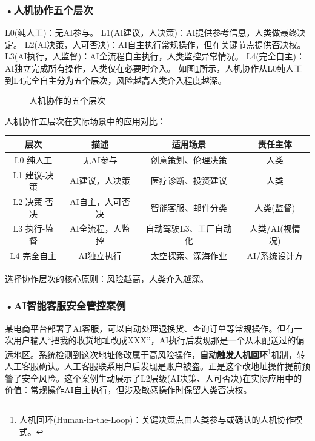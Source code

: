 \subsubsection*{\textbf{•人机协作五个层次}}

L0(纯人工)：无AI参与。
L1(AI建议，人决策)：AI提供参考信息，人类做最终决定。
L2(AI决策，人可否决)：AI自主执行常规操作，但在关键节点提供否决权。
L3(AI执行，人监督)：AI全流程自主执行，人类监控异常情况。
L4(完全自主)：AI独立完成所有操作，人类仅在必要时介入。 如图\ref{fig:ch3_3_32}所示，人机协作从L0纯人工到L4完全自主分为五个层次，风险越高人类介入程度越深。

\begin{figure}[H]
\centering
{}
\caption{人机协作的五个层次}
\label{fig:ch3_3_32} 
\end{figure}

\vfill
\begin{knowledgebox}
人机协作五层次在实际场景中的应用对比：

\begin{formalTable}[H]
\caption{人机协作五层次对比}
\label{tab:ch3_07_collaboration}
\begin{tabular}{c c c c}
\toprule
\bfseries 层次 & \bfseries 描述 & \bfseries 适用场景 & \bfseries 责任主体 \\ \midrule
L0 纯人工 & 无AI参与 & 创意策划、伦理决策 & 人类 \\
L1 建议-决策 & AI建议，人决策 & 医疗诊断、投资建议 & 人类 \\
L2 决策-否决 & AI自主，人可否决 & 智能客服、邮件分类 & 人类(监督) \\
L3 执行-监督 & AI全流程，人监控 & 自动驾驶L3、工厂自动化 & 人类/AI(视情况) \\
L4 完全自主 & AI独立执行 & 太空探索、深海作业 & AI/系统设计方 \\ \bottomrule
\end{tabular}
\end{formalTable}

选择协作层次的核心原则：风险越高，人类介入越深。
\end{knowledgebox}
\vspace{1em}


\subsubsection*{\textbf{•AI智能客服安全管控案例}}
某电商平台部署了AI客服，可以自动处理退换货、查询订单等常规操作。但有一次用户输入“把我的收货地址改成XXX”，AI执行后发现那是一个从未配送过的偏远地区。系统检测到这次地址修改属于高风险操作，\textbf{自动触发人机回环}\footnote{人机回环(Human-in-the-Loop)：关键决策点由人类参与或确认的人机协作模式。}机制，转人工客服确认。人工客服联系用户后发现是账户被盗。正是这个改地址操作提前预警了安全风险。这个案例生动展示了L2层级(AI决策、人可否决)在实际应用中的价值：常规操作AI自主执行，但涉及敏感操作时保留人类否决权。


